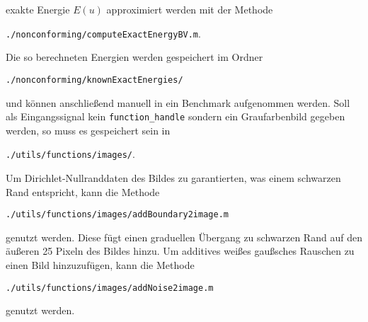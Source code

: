 exakte Energie $E(u)$ approximiert werden mit der Methode
\begin{center}
  \texttt{./nonconforming/computeExactEnergyBV.m}.
\end{center}
Die so berechneten Energien werden gespeichert im Ordner
\begin{center}
  \texttt{./nonconforming/knownExactEnergies/}
\end{center}
und können anschließend manuell in ein Benchmark aufgenommen werden.
Soll als Eingangssignal kein \texttt{function\_handle} sondern ein
Graufarbenbild gegeben werden, so muss es gespeichert sein in 
\begin{center}
  \texttt{./utils/functions/images/}.
\end{center}
Um Dirichlet-Nullranddaten des Bildes zu garantierten, was einem schwarzen Rand
entspricht, kann die Methode 
\begin{center}
  \texttt{./utils/functions/images/addBoundary2image.m}
\end{center}
genutzt werden. Diese fügt einen graduellen Übergang zu schwarzen Rand auf den 
äußeren 25 Pixeln des Bildes hinzu.
Um additives weißes gaußsches Rauschen zu einen Bild hinzuzufügen, kann die
Methode
\begin{center}
  \texttt{./utils/functions/images/addNoise2image.m}
\end{center}
genutzt werden. 

